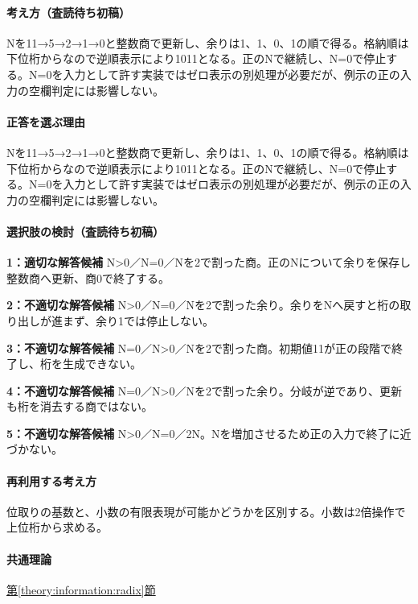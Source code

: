 \paragraph{考え方（査読待ち初稿）} Nを11→5→2→1→0と整数商で更新し、余りは1、1、0、1の順で得る。格納順は下位桁からなので逆順表示により1011となる。正のNで継続し、N=0で停止する。N=0を入力として許す実装ではゼロ表示の別処理が必要だが、例示の正の入力の空欄判定には影響しない。

\paragraph{正答を選ぶ理由} Nを11→5→2→1→0と整数商で更新し、余りは1、1、0、1の順で得る。格納順は下位桁からなので逆順表示により1011となる。正のNで継続し、N=0で停止する。N=0を入力として許す実装ではゼロ表示の別処理が必要だが、例示の正の入力の空欄判定には影響しない。

\paragraph{選択肢の検討（査読待ち初稿）}

\noindent\textbf{1：適切な解答候補} N>0／N=0／Nを2で割った商。正のNについて余りを保存し整数商へ更新、商0で終了する。\par

\noindent\textbf{2：不適切な解答候補} N>0／N=0／Nを2で割った余り。余りをNへ戻すと桁の取り出しが進まず、余り1では停止しない。\par

\noindent\textbf{3：不適切な解答候補} N=0／N>0／Nを2で割った商。初期値11が正の段階で終了し、桁を生成できない。\par

\noindent\textbf{4：不適切な解答候補} N=0／N>0／Nを2で割った余り。分岐が逆であり、更新も桁を消去する商ではない。\par

\noindent\textbf{5：不適切な解答候補} N>0／N=0／2N。Nを増加させるため正の入力で終了に近づかない。\par

\paragraph{再利用する考え方} 位取りの基数と、小数の有限表現が可能かどうかを区別する。小数は2倍操作で上位桁から求める。

\paragraph{共通理論} \hyperref[theory:information:radix]{第\ref*{theory:information:radix}節}


